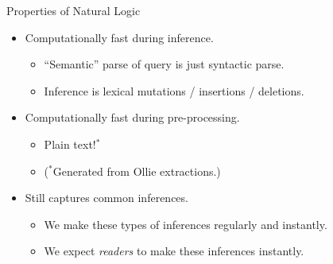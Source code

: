 \documentclass[hyperref]{beamer}
\begin{document}
\begin{frame}{Properties of Natural Logic}
\begin{itemize}
  \item[\green{\checkmark}] Computationally fast during inference.
  \begin{itemize}
    \item ``Semantic'' parse of query is just syntactic parse.
    \item Inference is lexical mutations / insertions / deletions.
  \end{itemize}
  \vspace{0.5cm}
  \pause

  \item[\green{\checkmark}] Computationally fast during pre-processing.
  \begin{itemize}
    \item Plain text!$^*$
    \pause
    \item[] ($^*$Generated from Ollie extractions.)
  \end{itemize}
  \vspace{0.5cm}
  \pause

  \item[\green{\checkmark}] Still captures common inferences.
  \begin{itemize}
    \item We make these types of inferences regularly and instantly.
    \pause
    \item We expect \textit{readers} to make these inferences instantly.
  \end{itemize}
\end{itemize}
\end{frame}



\end{document}
